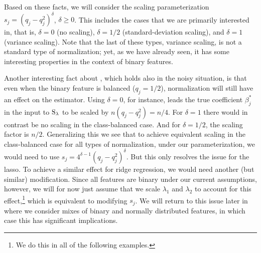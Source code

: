 Based on these facts, we will consider the scaling parameterization \(s_j =
(q_j-q_j^2)^\delta\), \(\delta \geq 0\). This includes the cases that we are primarily
interested in, that is, \(\delta = 0\) (no scaling), \(\delta = 1/2\) (standard-deviation
scaling), and \(\delta = 1\) (variance scaling). Note that the last of these types,
variance scaling, is not a standard type of normalization; yet, as we have already seen, it
has some interesting properties in the context of binary features.

Another interesting fact about , which holds also in the noisy
situation, is that even when the binary feature is balanced (\(q_j = 1/2\)), normalization
will still have an effect on the estimator. Using \(\delta = 0\), for instance, leads the
true coefficient \(\beta_j^*\) in the input to \(\operatorname{S}_\lambda\) to be scaled by \(n (q_j -
q_j^2) = n/4\). For \(\delta = 1\) there would in contrast be no scaling in the
class-balanced case. And for \(\delta = 1/2\), the scaling factor is \(n/2\). Generalizing
this we see that to achieve equivalent scaling in the class-balanced case for all types of
normalization, under our parameterization, we would need to use \(s_j = 4^{\delta - 1} (q_j
- q_j^2)^\delta\). But this only resolves the issue for the lasso. To achieve a similar
effect for ridge regression, we would need another (but similar) modification. Since all
features are binary under our current assumptions, however, we will for now just assume
that we scale \(\lambda_1\) and \(\lambda_2\) to account for this effect,\footnote{We do
  this in all of the following examples.} which is equivalent to modifying \(s_j\). We will
return to this issue later in  where we consider mixes of binary and
normally distributed features, in which case this has significant implications.


